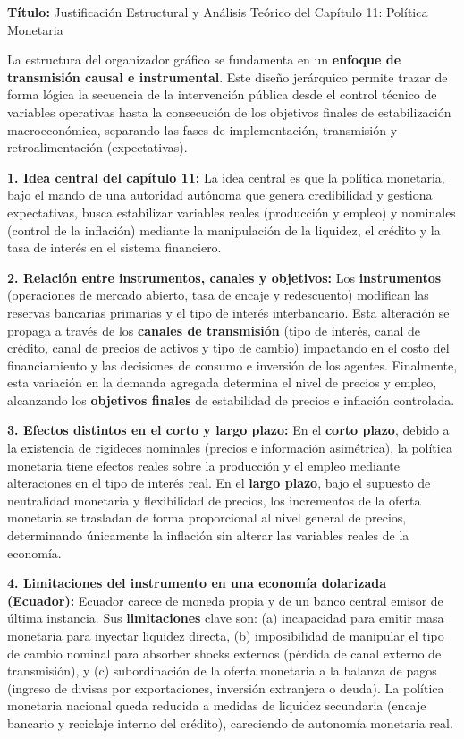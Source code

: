 \documentclass[12pt,spanish]{article}
\begin{document}
\textbf{Título:} Justificación Estructural y Análisis Teórico del
Capítulo 11: Política Monetaria

La estructura del organizador gráfico se fundamenta en un
\textbf{enfoque de transmisión causal e instrumental}. Este diseño
jerárquico permite trazar de forma lógica la secuencia de la
intervención pública desde el control técnico de variables operativas
hasta la consecución de los objetivos finales de estabilización
macroeconómica, separando las fases de implementación, transmisión y
retroalimentación (expectativas).

\textbf{1. Idea central del capítulo 11:} La idea central es que la
política monetaria, bajo el mando de una autoridad autónoma que genera
credibilidad y gestiona expectativas, busca estabilizar variables reales
(producción y empleo) y nominales (control de la inflación) mediante la
manipulación de la liquidez, el crédito y la tasa de interés en el
sistema financiero.

\textbf{2. Relación entre instrumentos, canales y objetivos:} Los
\textbf{instrumentos} (operaciones de mercado abierto, tasa de encaje y
redescuento) modifican las reservas bancarias primarias y el tipo de
interés interbancario. Esta alteración se propaga a través de los
\textbf{canales de transmisión} (tipo de interés, canal de crédito,
canal de precios de activos y tipo de cambio) impactando en el costo del
financiamiento y las decisiones de consumo e inversión de los agentes.
Finalmente, esta variación en la demanda agregada determina el nivel de
precios y empleo, alcanzando los \textbf{objetivos finales} de
estabilidad de precios e inflación controlada.

\textbf{3. Efectos distintos en el corto y largo plazo:} En el
\textbf{corto plazo}, debido a la existencia de rigideces nominales
(precios e información asimétrica), la política monetaria tiene efectos
reales sobre la producción y el empleo mediante alteraciones en el tipo
de interés real. En el \textbf{largo plazo}, bajo el supuesto de
neutralidad monetaria y flexibilidad de precios, los incrementos de la
oferta monetaria se trasladan de forma proporcional al nivel general de
precios, determinando únicamente la inflación sin alterar las variables
reales de la economía.

\textbf{4. Limitaciones del instrumento en una economía dolarizada
(Ecuador):} Ecuador carece de moneda propia y de un banco central emisor
de última instancia. Sus \textbf{limitaciones} clave son: (a)
incapacidad para emitir masa monetaria para inyectar liquidez directa,
(b) imposibilidad de manipular el tipo de cambio nominal para absorber
shocks externos (pérdida de canal externo de transmisión), y (c)
subordinación de la oferta monetaria a la balanza de pagos (ingreso de
divisas por exportaciones, inversión extranjera o deuda). La política
monetaria nacional queda reducida a medidas de liquidez secundaria
(encaje bancario y reciclaje interno del crédito), careciendo de
autonomía monetaria real.
\end{document}
